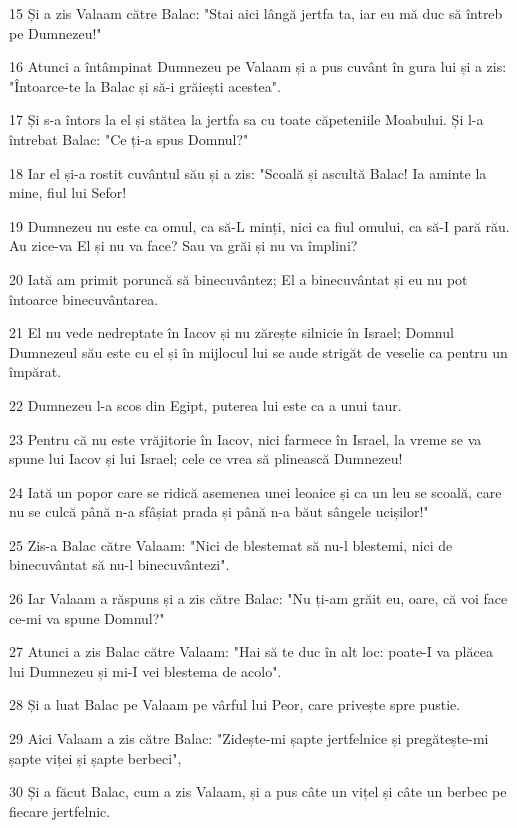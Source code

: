 \par 15 Și a zis Valaam către Balac: "Stai aici lângă jertfa ta, iar eu mă duc să întreb pe Dumnezeu!"
\par 16 Atunci a întâmpinat Dumnezeu pe Valaam și a pus cuvânt în gura lui și a zis: "Întoarce-te la Balac și să-i grăiești acestea".
\par 17 Și s-a întors la el și stătea la jertfa sa cu toate căpeteniile Moabului. Și l-a întrebat Balac: "Ce ți-a spus Domnul?"
\par 18 Iar el și-a rostit cuvântul său și a zis: "Scoală și ascultă Balac! Ia aminte la mine, fiul lui Sefor!
\par 19 Dumnezeu nu este ca omul, ca să-L minți, nici ca fiul omului, ca să-I pară rău. Au zice-va El și nu va face? Sau va grăi și nu va împlini?
\par 20 Iată am primit poruncă să binecuvântez; El a binecuvântat și eu nu pot întoarce binecuvântarea.
\par 21 El nu vede nedreptate în Iacov și nu zărește silnicie în Israel; Domnul Dumnezeul său este cu el și în mijlocul lui se aude strigăt de veselie ca pentru un împărat.
\par 22 Dumnezeu l-a scos din Egipt, puterea lui este ca a unui taur.
\par 23 Pentru că nu este vrăjitorie în Iacov, nici farmece în Israel, la vreme se va spune lui Iacov și lui Israel; cele ce vrea să plinească Dumnezeu!
\par 24 Iată un popor care se ridică asemenea unei leoaice și ca un leu se scoală, care nu se culcă până n-a sfâșiat prada și până n-a băut sângele ucișilor!"
\par 25 Zis-a Balac către Valaam: "Nici de blestemat să nu-l blestemi, nici de binecuvântat să nu-l binecuvântezi".
\par 26 Iar Valaam a răspuns și a zis către Balac: "Nu ți-am grăit eu, oare, că voi face ce-mi va spune Domnul?"
\par 27 Atunci a zis Balac către Valaam: "Hai să te duc în alt loc: poate-I va plăcea lui Dumnezeu și mi-I vei blestema de acolo".
\par 28 Și a luat Balac pe Valaam pe vârful lui Peor, care privește spre pustie.
\par 29 Aici Valaam a zis către Balac: "Zidește-mi șapte jertfelnice și pregătește-mi șapte viței și șapte berbeci",
\par 30 Și a făcut Balac, cum a zis Valaam, și a pus câte un vițel și câte un berbec pe fiecare jertfelnic.

